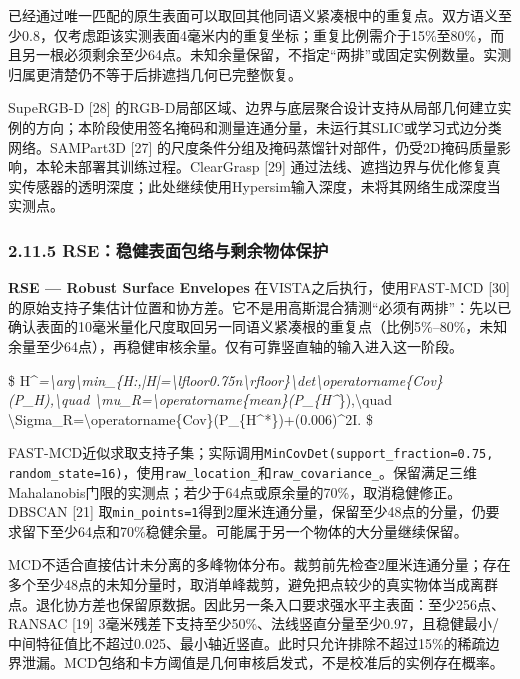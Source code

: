 \documentclass[UTF8,fontset=fandol]{ctexart}
\begin{document}
已经通过唯一匹配的原生表面可以取回其他同语义紧凑根中的重复点。双方语义至少0.8，仅考虑距该实测表面4毫米内的重复坐标；重复比例需介于15\%至80\%，而且另一根必须剩余至少64点。未知余量保留，不指定“两排”或固定实例数量。实测归属更清楚仍不等于后排遮挡几何已完整恢复。



SupeRGB-D [28] 的RGB-D局部区域、边界与底层聚合设计支持从局部几何建立实例的方向；本阶段使用签名掩码和测量连通分量，未运行其SLIC或学习式边分类网络。SAMPart3D [27] 的尺度条件分组及掩码蒸馏针对部件，仍受2D掩码质量影响，本轮未部署其训练过程。ClearGrasp [29] 通过法线、遮挡边界与优化修复真实传感器的透明深度；此处继续使用Hypersim输入深度，未将其网络生成深度当实测点。



\subsubsection*{2.11.5 RSE：稳健表面包络与剩余物体保护}

\textbf{RSE — Robust Surface Envelopes} 在VISTA之后执行，使用FAST-MCD [30] 的原始支持子集估计位置和协方差。它不是用高斯混合猜测“必须有两排”：先以已确认表面的10毫米量化尺度取回另一同语义紧凑根的重复点（比例5\%–80\%，未知余量至少64点），再稳健审核余量。仅有可靠竖直轴的输入进入这一阶段。



\$
H\textasciicircum{}\emph{=\textbackslash{}arg\textbackslash{}min\_\{H:,|H|=\textbackslash{}lfloor0.75n\textbackslash{}rfloor\}\textbackslash{}det\textbackslash{}operatorname\{Cov\}(P\_H),\textbackslash{}quad
\textbackslash{}mu\_R=\textbackslash{}operatorname\{mean\}(P\_\{H\textasciicircum{}}\}),\textbackslash{}quad \textbackslash{}Sigma\_R=\textbackslash{}operatorname\{Cov\}(P\_\{H\textasciicircum{}*\})+(0.006)\textasciicircum{}2I.
\$



FAST-MCD近似求取支持子集；实际调用\texttt{MinCovDet(support\_\allowbreak{}fraction=0.\allowbreak{}75, random\_\allowbreak{}state=16)}，使用\texttt{raw\_\allowbreak{}location\_\allowbreak{}}和\texttt{raw\_\allowbreak{}covariance\_\allowbreak{}}。保留满足三维Mahalanobis门限的实测点；若少于64点或原余量的70\%，取消稳健修正。DBSCAN [21] 取\texttt{min\_\allowbreak{}points=1}得到2厘米连通分量，保留至少48点的分量，仍要求留下至少64点和70\%稳健余量。可能属于另一个物体的大分量继续保留。



MCD不适合直接估计未分离的多峰物体分布。裁剪前先检查2厘米连通分量；存在多个至少48点的未知分量时，取消单峰裁剪，避免把点较少的真实物体当成离群点。退化协方差也保留原数据。因此另一条入口要求强水平主表面：至少256点、RANSAC [19] 3毫米残差下支持至少50\%、法线竖直分量至少0.97，且稳健最小/中间特征值比不超过0.025、最小轴近竖直。此时只允许排除不超过15\%的稀疏边界泄漏。MCD包络和卡方阈值是几何审核启发式，不是校准后的实例存在概率。
\end{document}
